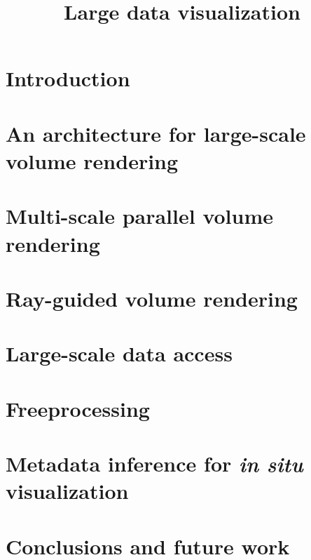 \documentclass[12pt,twoside,headsepline,titlepage]{thesis}
\title{Large data visualization}
\begin{document}

\newpage


\chapter{Introduction}


\chapter{An architecture for large-scale volume rendering}
\label{chp:tuvok}


\chapter{Multi-scale parallel volume rendering}
\label{chp:multiscale}


\chapter{Ray-guided volume rendering}
\label{chp:rayguided}


\chapter{Large-scale data access}
\label{chp:io}


\chapter{Freeprocessing}
\label{chp:freeprocessing}


\chapter{Metadata inference for \textit{in situ} visualization}
\label{chp:inference}


\chapter{Conclusions and future work}
\label{chp:conclusions}




\end{document}
